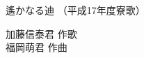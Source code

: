 \documentclass[10pt,b5j]{tarticle} %
\begin{document}
\begin{minipage}[c]{0.7\hsize} %
    \begin{center}
        {\LARGE
            遙かなる迪 %
        }
        {\small 
            （平成17年度寮歌） %
        }
    \end{center}
\end{minipage}
\begin{minipage}[c]{0.3\hsize} %
    \begin{flushright} %
        加藤信泰君 作歌\\福岡萌君 作曲 %
    \end{flushright}
\end{minipage}
\end{document}
